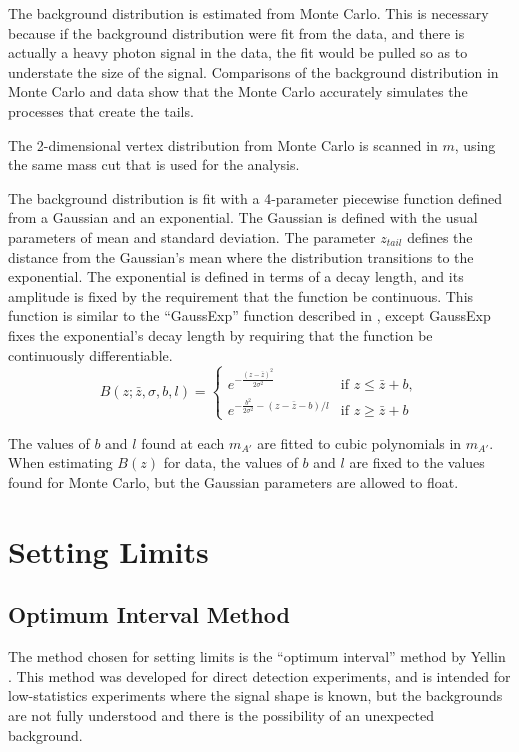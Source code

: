 The background distribution is estimated from Monte Carlo.
This is necessary because if the background distribution were fit from the data, and there is actually a heavy photon signal in the data, the fit would be pulled so as to understate the size of the signal.
Comparisons of the background distribution in Monte Carlo and data show that the Monte Carlo accurately simulates the processes that create the tails.

The 2-dimensional vertex distribution from Monte Carlo is scanned in $m$, using the same mass cut that is used for the analysis.

The background distribution is fit with a 4-parameter piecewise function defined from a Gaussian and an exponential.
The Gaussian is defined with the usual parameters of mean and standard deviation.
The parameter $z_{tail}$ defines the distance from the Gaussian's mean where the distribution transitions to the exponential.
The exponential is defined in terms of a decay length, and its amplitude is fixed by the requirement that the function be continuous.
This function is similar to the ``GaussExp'' function described in \cite{cms_collaboration_search_2015}, except GaussExp fixes the exponential's decay length by requiring that the function be continuously differentiable.
\begin{equation}
B(z;\bar{z},\sigma,b,l)=
\begin{cases}
e^{-\frac{(z-\bar{z})^2}{2\sigma^2}} &\text{if } z\le\bar{z}+b,\\
e^{-\frac{b^2}{2\sigma^2} - (z-\bar{z}-b)/l}  &\text{if } z\ge\bar{z}+b
\end{cases}
\end{equation}

The values of $b$ and $l$ found at each $m_{A'}$ are fitted to cubic polynomials in $m_{A'}$.
When estimating $B(z)$ for data, the values of $b$ and $l$ are fixed to the values found for Monte Carlo, but the Gaussian parameters are allowed to float.

\section{Setting Limits}


\subsection{Optimum Interval Method}
The method chosen for setting limits is the ``optimum interval'' method by Yellin \cite{yellin_finding_2002}.
This method was developed for direct detection experiments, and is intended for low-statistics experiments where the signal shape is known, but the backgrounds are not fully understood and there is the possibility of an unexpected background.

